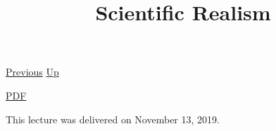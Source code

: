 \documentclass[12pt,a4paper]{report}
\begin{document}
 \href{doc/phil/People/Brandom/OnSellars/2019/PurePragmatics.html}{Previous} 
 \href{doc/phil/People/Brandom/OnSellars/2019.html}{Up} 

 \href{doc/phil/People/Brandom/OnSellars/2019/ScientificRealism.pdf}{PDF} 
\title{Scientific Realism}

\tableofcontents
This lecture was delivered on November 13, 2019.
\end{document}
